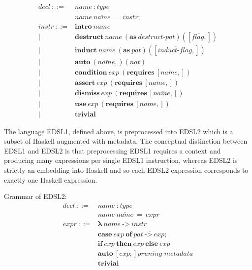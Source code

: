 \begin{align*}
  \textit{decl}~ ::= &
    \textit{name} ~ : ~ \textit{type} \\ &
    \textit{name} ~ \overline{\textit{name}} ~ = ~ \overline{\textit{instr} ; }
  \\
  \textit{instr} ~ ::= &
    \textbf{intro} ~ \textit{name} \\ | &
    \textbf{destruct} ~ \textit{name} ~ (\textbf{as} ~ \textit{destruct-pat}) ([\overline{\textit{flag},}]) \\ | &
    \textbf{induct} ~ \textit{name} ~ (\textbf{as} ~ \textit{pat}) ([\overline{\textit{induct-flag},}]) \\ | &
    \textbf{auto} ~ (\overline{\textit{name},}) (\textit{nat}) \\ | &
    \textbf{condition} ~ \textit{exp} ~ (\textbf{requires} ~ [\overline{\textit{name},}]) \\ | &
    \textbf{assert} ~ \textit{exp} ~ (\textbf{requires} ~ [\overline{\textit{name},}]) \\ | &
    \textbf{dismiss} ~ \textit{exp} ~ (\textbf{requires} ~ [\overline{\textit{name},}]) \\ | &
    \textbf{use} ~ \textit{exp} ~ (\textbf{requires} ~ [\overline{\textit{name},}]) \\ | &
    \textbf{trivial}
\end{align*}

The language EDSL1, defined above, is preprocessed into EDSL2 which is a subset of Haskell augmented with metadata. 
The conceptual distinction between EDSL1 and EDSL2 is that preprocessing EDSL1 requires a context and producing many expressions per single EDSL1 instruction, whereas EDSL2 is strictly an embedding into Haskell and so each EDSL2 expression corresponds to exactly one Haskell expression.

Grammar of EDSL2:
\begin{align*}
  \textit{decl}~ ::= &
    \textit{name} ~ : ~ \textit{type} \\ &
    \textit{name} ~ \overline{\textit{name}} ~ = ~ \textit{expr}
  \\
  \textit{expr}~ ::= &
    \mathbf{\lambda} ~ \textit{name} ~ \textbf{->} ~ \textit{instr} \\ &
    \textbf{case} ~ \textit{exp} ~ \textbf{of} ~ \overline{\textit{pat} ~ \textbf{->} ~ \textit{exp} ;} \\ & 
    \textbf{if} ~ \textit{exp} ~ \textbf{then} ~ \textit{exp} ~ \textbf{else} ~ \textit{exp} \\ & 
    \textbf{auto} ~ [\overline{\textit{exp} ;}] \textit{pruning-metadata} \\ & 
    \textbf{trivial}
\end{align*}

